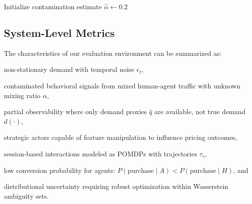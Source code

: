 \documentclass[sigconf]{acmart}
\begin{document}
\begin{algorithm}[t]
\caption{PHANTOM defensive pricing loop}
\label{alg:phantom_loop_clean}
\DontPrintSemicolon
{}

Initialize contamination estimate $\hat\alpha \leftarrow 0.2$\;

\end{algorithm}


\subsection{System-Level Metrics}

The characteristics of our evaluation environment can be summarized as:
\begin{enumerate*}[label=(\roman*)]
\item non-stationary demand with temporal noise $\epsilon_t$,
\item contaminated behavioral signals from mixed human-agent traffic with unknown mixing ratio $\alpha$,
\item partial observability where only demand proxies $\hat{q}$ are available, not true demand $d(\cdot)$,
\item strategic actors capable of feature manipulation to influence pricing outcomes,
\item session-based interactions modeled as POMDPs with trajectories $\tau_s$,
\item low conversion probability for agents: $P(\text{purchase} \mid A) < P(\text{purchase} \mid H)$, and
\item distributional uncertainty requiring robust optimization within Wasserstein ambiguity sets.
\end{enumerate*}
\end{document}
